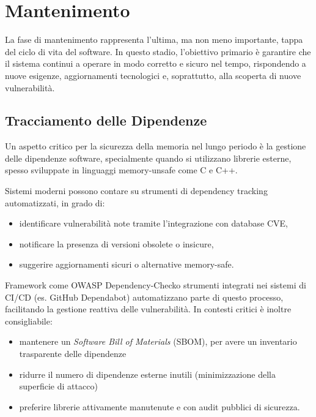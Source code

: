 \section{Mantenimento}
\label{sec:maintenance}

La fase di mantenimento rappresenta l'ultima, ma non meno importante, tappa del ciclo
di vita del software. In questo stadio, l'obiettivo primario è garantire che il sistema
continui a operare in modo corretto e sicuro nel tempo, rispondendo a nuove
esigenze, aggiornamenti tecnologici e, soprattutto, alla scoperta di nuove vulnerabilità.

\subsection{Tracciamento delle Dipendenze}
\label{sec:tracciamento-dipendenze}

Un aspetto critico per la sicurezza della memoria nel lungo periodo è la
gestione delle dipendenze software, specialmente quando si utilizzano librerie esterne,
spesso sviluppate in linguaggi memory-unsafe come C e C++.

Sistemi moderni possono contare su strumenti di dependency tracking
automatizzati, in grado di:
\begin{itemize}
  \item identificare vulnerabilità note tramite l'integrazione con database CVE,

  \item notificare la presenza di versioni obsolete o insicure,

  \item suggerire aggiornamenti sicuri o alternative memory-safe.
\end{itemize}

Framework come OWASP Dependency-Check\footnotemark o strumenti integrati nei sistemi di CI/CD
(es. GitHub Dependabot) automatizzano parte di questo processo, facilitando la gestione
reattiva delle vulnerabilità. In contesti critici è inoltre consigliabile:
\begin{itemize}
  \item mantenere un \textit{Software Bill of Materials} (SBOM), per avere un inventario
    trasparente delle dipendenze

  \item ridurre il numero di dipendenze esterne inutili (minimizzazione
    della superficie di attacco)

  \item preferire librerie attivamente manutenute e con audit pubblici di sicurezza.
\end{itemize}

